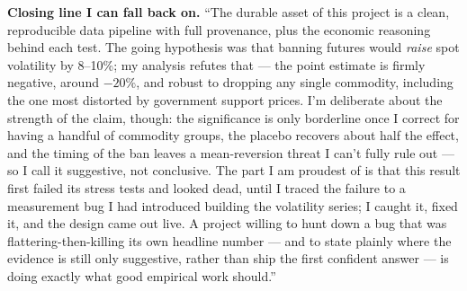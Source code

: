 \documentclass[11pt]{article}
\begin{document}
\noindent\textbf{Closing line I can fall back on.} ``The durable asset of this project is a clean,
reproducible data pipeline with full provenance, plus the economic reasoning behind each test. The
going hypothesis was that banning futures would \emph{raise} spot volatility by 8--10\%; my analysis
refutes that --- the point estimate is firmly negative, around $-20\%$, and robust to dropping any
single commodity, including the one most distorted by government support prices. I'm deliberate about
the strength of the claim, though: the significance is only borderline once I correct for having a
handful of commodity groups, the placebo recovers about half the effect, and the timing of the ban
leaves a mean-reversion threat I can't fully rule out --- so I call it suggestive, not conclusive.
The part I am proudest of is that this result first failed its stress tests and looked dead, until I
traced the failure to a measurement bug I had introduced building the volatility series; I caught it,
fixed it, and the design came out live. A project willing to hunt down a bug that was
flattering-then-killing its own headline number --- and to state plainly where the evidence is still
only suggestive, rather than ship the first confident answer --- is doing exactly what good empirical
work should.''
\end{document}
